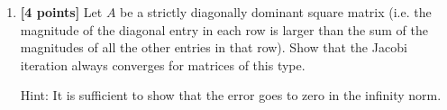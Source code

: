 \documentclass{article}
\begin{document}
\begin{enumerate}
\begin{enumerate}
\item Compute the condition number of $A$ in the 1-norm and repeat part (b) using this norm.
\begin{mdframed}[style=MyFrame]
\begin{tabular}{l l l}
$\displaystyle \kappa_{1} (A) = $ $ \Vert A^{-1} \Vert_{1} ~ \Vert A \Vert_{1} $\\
& $\Rightarrow ~ \Vert A^{-1} \Vert_{1} =281$ \\
& $~~~~~\Vert A \Vert_{1}=14 $  $ \Rightarrow ~ 14\times281=3934 $\\\\
\end{tabular}
\\
\begin{tabular}{p{3cm} | p{4.5cm} | p{4.5cm}}
$A \tilde{x} = \tilde{b}$
\begin{equation*}
\Rightarrow\begin{bmatrix}
    0.9496\\
    0.9979\\
    1.0076\\
    1.0095
\end{bmatrix}
\end{equation*}

&

$\Vert x-\tilde x \Vert_{1} / \Vert x \Vert_{1} = .0096$
&

$\displaystyle \Vert b - \tilde{b} \Vert_{1}/\Vert b \Vert_{1} = .0014$
    
\end{tabular}
\end{mdframed}

\end{enumerate}

{\bf Note}: You can use the file {\tt a3q1.m} to ensure that you are working with the correct $A$ and $b$ values.

\newpage
\item {\bf [4 points]} Let $A$ be a strictly diagonally dominant square matrix (i.e. the magnitude of the diagonal entry in each row is larger than the sum of the magnitudes of all the other entries in that row). Show that the Jacobi iteration always converges for matrices of this type.  

Hint: It is sufficient to show that the error goes to zero in the infinity norm.

\begin{mdframed}[style=MyFrame]




\end{mdframed}
\end{enumerate}
\end{document}

